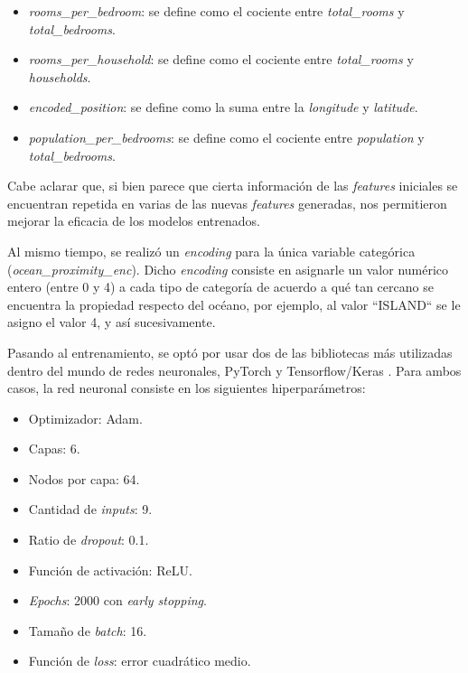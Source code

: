 \documentclass[11pt]{article}
\newcommand{\english}[1]{\textit{#1}}
\begin{document}
\begin{itemize}
    \item \english{rooms\_per\_bedroom}: se define como el cociente entre \english{total\_rooms} y \english{total\_bedrooms}.
    \item \english{rooms\_per\_household}: se define como el cociente entre \english{total\_rooms} y \english{households}.
    \item \english{encoded\_position}: se define como la suma entre la \english{longitude} y \english{latitude}.
    \item \english{population\_per\_bedrooms}: se define como el cociente entre \english{population} y \english{total\_bedrooms}.
\end{itemize}

Cabe aclarar que, si bien parece que cierta información de las \english{features} iniciales se encuentran repetida en varias de las nuevas \english{features} generadas, nos permitieron mejorar la eficacia de los modelos entrenados.

Al mismo tiempo, se realizó un \english{encoding} para la única variable categórica (\english{ocean\_proximity\_enc}). Dicho \english{encoding} consiste en asignarle un valor numérico entero (entre 0 y 4) a cada tipo de categoría de acuerdo a qué tan cercano se encuentra la propiedad respecto del océano, por ejemplo, al valor ``ISLAND`` se le asigno el valor 4, y así sucesivamente.

Pasando al entrenamiento, se optó por usar dos de las bibliotecas más utilizadas dentro del mundo de redes neuronales, PyTorch \cite{python:lib:pytorch} y Tensorflow/Keras \cite{python:lib:tensorflow}. Para ambos casos, la red neuronal consiste en los siguientes hiperparámetros:

\begin{itemize}
    \item Optimizador: Adam.
    \item Capas: 6.
    \item Nodos por capa: 64.
    \item Cantidad de \english{inputs}: 9.
    \item Ratio de \english{dropout}: 0.1.
    \item Función de activación: ReLU.
    \item \english{Epochs}: 2000 con \english{early stopping}.
    \item Tamaño de \english{batch}: 16.
    \item Función de \english{loss}: error cuadrático medio.
\end{itemize}
\end{document}
